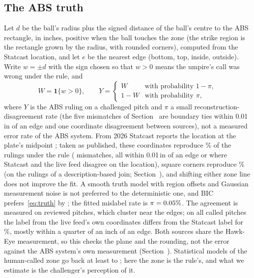 \documentclass[aoas]{imsart}
\theoremstyle{plain}
\theoremstyle{definition}
\begin{document}
\subsection{The ABS truth}\label{sec:truth}
Let $d$ be the ball's radius plus the signed distance of the ball's centre to the ABS rectangle, in inches, positive
when the ball touches the zone (the strike region is the rectangle grown by the radius, with rounded corners),
computed from the Statcast location, and let $e$ be the nearest edge (bottom, top, inside, outside). Write $w=\pm d$
with the sign chosen so that $w>0$ means the umpire's call was wrong under the rule, and
\begin{equation}\label{eq:truth}
W = \mathbf 1\{w>0\}, \qquad Y = \begin{cases} W & \text{with probability } 1-\pi,\\ 1-W & \text{with probability } \pi, \end{cases}
\end{equation}
where $Y$ is the ABS ruling on a challenged pitch and $\pi$ a small reconstruction-disagreement rate (the five mismatches of Section~ are boundary ties within 0.01\,in of an edge and one coordinate
disagreement between sources), not a
measured error rate of the ABS system. From 2026 Statcast reports the
location at the plate's midpoint \citep{SavantCSV2026}; taken as published, these coordinates reproduce \GeomRepro\%
of the \GeomN{} rulings under the rule (\GeomMismatch{} mismatches, all within 0.01\,in of an edge or where Statcast and
the live feed disagree on the location), square corners reproduce \GeomReproSquare\% (on the \GeomNOld{} rulings of a description-based join; Section~), and shifting either zone line
does not improve the fit. A smooth truth model with region offsets and Gaussian measurement noise is not preferred to the deterministic one, and BIC prefers~\eqref{eq:truth} by \BICSmoothMinusDet; the fitted mislabel rate is
$\pi=0.05\%$. The agreement is measured on reviewed pitches, which cluster near the edges; on all called pitches
the label from the live feed's own coordinates differs from the Statcast label for \LabelDifferPct\%, mostly within a
quarter of an inch of an edge. Both sources share the Hawk-Eye measurement, so this checks the plane and the rounding,
not the error against the ABS system's own measurement (Section~). Statistical models of the
human-called zone go back at least to \citet{ZimmermanEtAl2019}; here the zone is the rule's, and what we estimate is
the challenger's perception of it.
\end{document}
